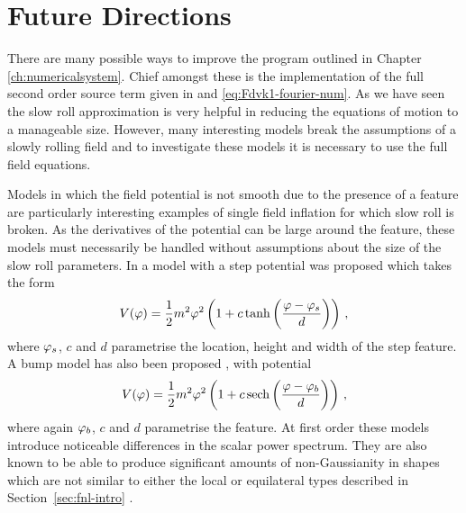 \section{Future Directions}
\label{sec:next-res}

There are many possible ways to improve the program outlined in
Chapter \ref{ch:numericalsystem}. Chief amongst these is the implementation of the
full second order source term given in  and
\eqref{eq:Fdvk1-fourier-num}. 
As we have seen the slow roll approximation is very helpful in reducing the equations of motion to
a manageable size. However, many interesting models break the assumptions of a slowly rolling field
and to investigate these models it is necessary to use the full field equations.

Models in which the field potential is not smooth due to the presence of a feature are
particularly interesting examples of single field inflation for which slow roll is broken. 
As the
derivatives of the potential can be large around the feature, these models must necessarily be
handled without assumptions about the size of the slow roll parameters. 
In  a model with a step potential was proposed which takes the form
% 
\begin{equation}
 V(\varphi) = \frac{1}{2}m^2\varphi^2\left(1 + c\tanh\left(\frac{\varphi -\varphi_s}{d}\right)\right)\,,
\end{equation}
% 
where $\varphi_s$, $c$ and $d$ parametrise the location, height and width of the step feature. A bump
model has also been proposed \cite{Chen:2008wn}, with potential 
% 
\begin{equation}
 V(\varphi) = \frac{1}{2}m^2\varphi^2\left(1 + c\,\mathrm{sech}\left(\frac{\varphi-\varphi_b}{d}\right)\right)\,,
\end{equation}
% 
where again $\varphi_b$, $c$ and $d$ parametrise the feature. At first order these models introduce
noticeable differences in the scalar power spectrum. They are also known to be able to produce
significant amounts of non-Gaussianity in shapes which are not similar to either the local or
equilateral types described in Section~\ref{sec:fnl-intro} \cite{Chen:2006xjb, Chen:2008wn}.


